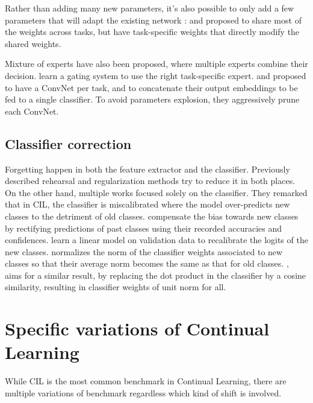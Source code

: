 Rather than adding many new parameters, it's also possible to only add a few parameters that will
adapt the existing network \citep{rebuffi2017visualadapters}: \cite{wen2020batchensemble} and
\cite{sun2019metatransfer} proposed to share most of the weights across tasks, but have
task-specific weights that directly modify the shared weights.

Mixture of experts \citep{masoudnia2014mixture} have also been proposed, where multiple experts
combine their decision. \cite{aljundi2017experts} learn a gating system to use the right
task-specific expert. \cite{yan2021der} and \cite{li2021preserve} proposed to have a \ac{ConvNet}
per task, and to concatenate their output embeddings to be fed to a single classifier. To avoid
parameters explosion, they aggressively prune each \ac{ConvNet}.

\subsection{Classifier correction}
\label{sec:related_classif_correction}

Forgetting happen in both the feature extractor and the classifier. Previously described
rehearsal and regularization methods try to reduce it in both places. On the other hand, multiple
works focused solely on the classifier. They remarked that in \acf{CIL}, the classifier is
miscalibrated \citep{guo2017miscalibration} where the model over-predicts new classes to the
detriment of old classes. \cite{belouadah2019il2m} compensate the bias towards new classes by
rectifying predictions of past classes using their recorded accuracies and confidences.
\cite{wu2019bias_correction} learn a linear model on validation data to recalibrate the logits of
the new classes. \cite{zhao2020weightalignement} normalizes the norm of the classifier weights
associated to new classes so that their average norm becomes the same as that for old classes.
\cite{hou2019ucir}, aims for a similar result, by replacing the dot product in the classifier by a
cosine similarity, resulting in classifier weights of unit norm for all.

\section{Specific variations of Continual Learning}
\label{sec:related_variation}

While \acf{CIL} is the most common benchmark in Continual Learning, there are multiple variations of
benchmark regardless which kind of shift is involved.

